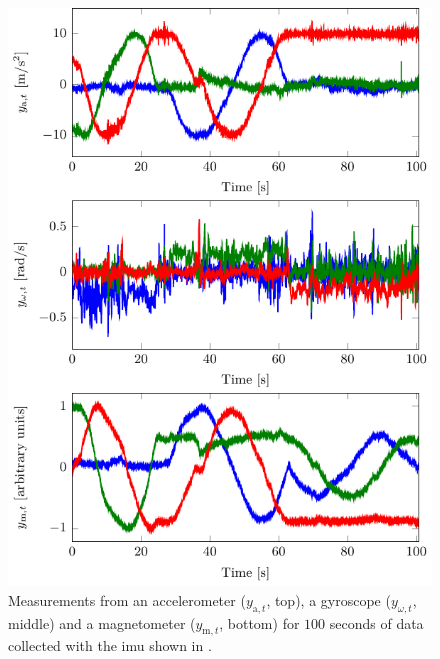 \begin{figure}
	\centering
	\includegraphics[scale = 1]{figure4_3.pdf}
    	\caption{Measurements from an accelerometer ($y_{\text{a},t}$, top), a gyroscope ($y_{\omega,t}$, middle) and a magnetometer ($y_{\text{m},t}$, bottom) for $100$ seconds of data collected with the \gls{imu} shown in .}
	\label{fig:oriEst-expDataViconLab}
\end{figure}

